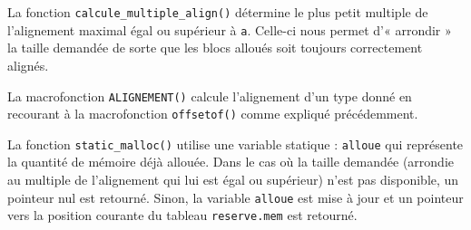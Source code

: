 \documentclass[]{article}
\begin{document}
La fonction \texttt{calcule\_multiple\_align()} détermine le plus petit
multiple de l'alignement maximal égal ou supérieur à \texttt{a}.
Celle-ci nous permet d'« arrondir » la taille demandée de sorte que les
blocs alloués soit toujours correctement alignés.

La macrofonction \texttt{ALIGNEMENT()} calcule l'alignement d'un type
donné en recourant à la macrofonction \texttt{offsetof()} comme expliqué
précédemment.

La fonction \texttt{static\_malloc()} utilise une variable statique :
\texttt{alloue} qui représente la quantité de mémoire déjà allouée. Dans
le cas où la taille demandée (arrondie au multiple de l'alignement qui
lui est égal ou supérieur) n'est pas disponible, un pointeur nul est
retourné. Sinon, la variable \texttt{alloue} est mise à jour et un
pointeur vers la position courante du tableau \texttt{reserve.mem} est
retourné.
\end{document}
